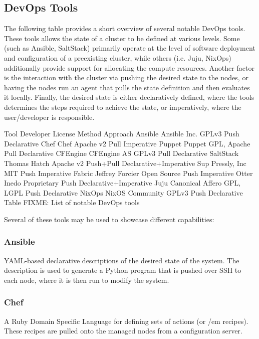 \documentclass[9pt,twocolumn,twoside]{styles/osajnl}
\begin{document}
\subsection{DevOps Tools}

The following table provides a short overview of several notable DevOps tools. These tools allows the state of a cluster to be defined at various levels. Some (such as Ansible, SaltStack) primarily operate at the level of software deployment and configuration of a preexisting cluster, while others (i.e. Juju, NixOps) additionally provide support for allocating the compute resources. Another factor is the interaction with the cluster via pushing the desired state to the nodes, or having the nodes run an agent that pulls the state definition and then evaluates it locally. Finally, the desired state is either declaratively defined, where the tools determines the steps required to achieve the state, or imperatively, where the user/developer is responsible.


Tool
	Developer
	License
	Method
	Approach
	Ansible
	Ansible Inc.
	GPLv3
	Push
	Declarative
	Chef
	Chef
	Apache v2
	Pull
	Imperative
	Puppet
	Puppet
	GPL, Apache
	Pull
	Declarative
	CFEngine
	CFEngine AS
	GPLv3
	Pull
	Declarative
	SaltStack
	Thomas Hatch
	Apache v2
	Push+Pull
	Declarative+Imperative
	Sup
	Pressly, Inc
	MIT
	Push
	Imperative
	Fabric
	Jeffrey Forcier
	Open Source
	Push
	Imperative
	Otter
	Inedo
	Proprietary
	Push
	Declarative+Imperative
	Juju
	Canonical
	Affero GPL, LGPL
	Push
	Declarative
	NixOps
	NixOS Community
	GPLv3
	Push
	Declarative
	Table FIXME: List of notable DevOps tools


Several of these tools may be used to showcase different capabilities:


\subsubsection{Ansible}

YAML-based declarative descriptions of the desired state of the system. The description is used to generate a Python program that is pushed over SSH to each node, where it is then run to modify the system.


\subsubsection{Chef}

A Ruby Domain Specific Language for defining sets of actions (or {/em recipes}). These recipes are pulled onto the managed nodes from a configuration server.
\end{document}
